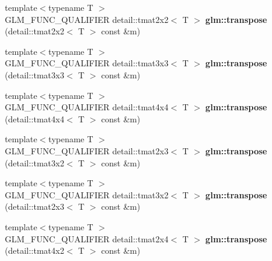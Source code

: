 \begin{DoxyCompactItemize}
\item 
\hypertarget{namespaceglm_a5c06983680df715f2ca2ade44551d8cd}{{\footnotesize template$<$typename T $>$ }\\\-G\-L\-M\-\_\-\-F\-U\-N\-C\-\_\-\-Q\-U\-A\-L\-I\-F\-I\-E\-R \*
detail\-::tmat2x2$<$ \-T $>$ {\bfseries glm\-::transpose} (detail\-::tmat2x2$<$ \-T $>$ const \&m)}\label{namespaceglm_a5c06983680df715f2ca2ade44551d8cd}

\item 
\hypertarget{namespaceglm_a98952332d8165d133ab5122f2ffaf428}{{\footnotesize template$<$typename T $>$ }\\\-G\-L\-M\-\_\-\-F\-U\-N\-C\-\_\-\-Q\-U\-A\-L\-I\-F\-I\-E\-R \*
detail\-::tmat3x3$<$ \-T $>$ {\bfseries glm\-::transpose} (detail\-::tmat3x3$<$ \-T $>$ const \&m)}\label{namespaceglm_a98952332d8165d133ab5122f2ffaf428}

\item 
\hypertarget{namespaceglm_ab9ab40d606cce96e1170448437cb6f74}{{\footnotesize template$<$typename T $>$ }\\\-G\-L\-M\-\_\-\-F\-U\-N\-C\-\_\-\-Q\-U\-A\-L\-I\-F\-I\-E\-R \*
detail\-::tmat4x4$<$ \-T $>$ {\bfseries glm\-::transpose} (detail\-::tmat4x4$<$ \-T $>$ const \&m)}\label{namespaceglm_ab9ab40d606cce96e1170448437cb6f74}

\item 
\hypertarget{namespaceglm_a45c436155979bc13e854fb1c2aa7469b}{{\footnotesize template$<$typename T $>$ }\\\-G\-L\-M\-\_\-\-F\-U\-N\-C\-\_\-\-Q\-U\-A\-L\-I\-F\-I\-E\-R \*
detail\-::tmat2x3$<$ \-T $>$ {\bfseries glm\-::transpose} (detail\-::tmat3x2$<$ \-T $>$ const \&m)}\label{namespaceglm_a45c436155979bc13e854fb1c2aa7469b}

\item 
\hypertarget{namespaceglm_a4313124a0d33b556ab63305ca7e0911f}{{\footnotesize template$<$typename T $>$ }\\\-G\-L\-M\-\_\-\-F\-U\-N\-C\-\_\-\-Q\-U\-A\-L\-I\-F\-I\-E\-R \*
detail\-::tmat3x2$<$ \-T $>$ {\bfseries glm\-::transpose} (detail\-::tmat2x3$<$ \-T $>$ const \&m)}\label{namespaceglm_a4313124a0d33b556ab63305ca7e0911f}

\item 
\hypertarget{namespaceglm_aed2ebe1b1aea15e43bad09005b29fb8a}{{\footnotesize template$<$typename T $>$ }\\\-G\-L\-M\-\_\-\-F\-U\-N\-C\-\_\-\-Q\-U\-A\-L\-I\-F\-I\-E\-R \*
detail\-::tmat2x4$<$ \-T $>$ {\bfseries glm\-::transpose} (detail\-::tmat4x2$<$ \-T $>$ const \&m)}\label{namespaceglm_aed2ebe1b1aea15e43bad09005b29fb8a}


\end{DoxyCompactItemize}
